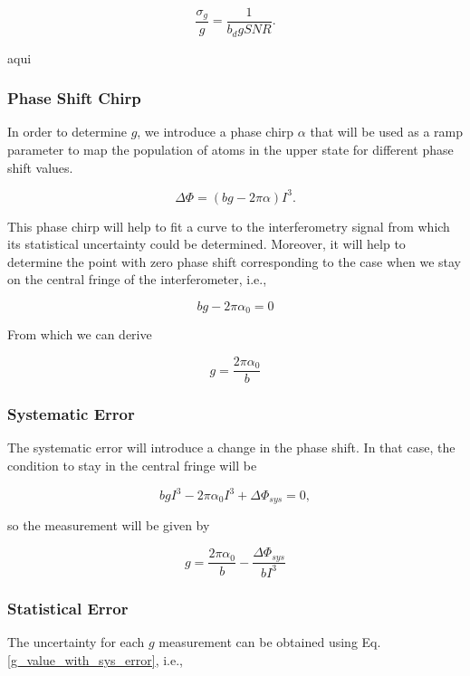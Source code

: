 \documentclass{article}
\begin{document}
\begin{equation}\label{sensitivity_eq_dipole}
    \frac{\sigma_{g}}{g} = \frac{1}{b_{d} g SNR}.
\end{equation}

aqui 

\subsubsection{Phase Shift Chirp}
In order to determine $g$, we introduce a phase chirp $\alpha$ that will be used as a ramp parameter to map the population of atoms in the upper state for different phase shift values. 

\begin{equation}
    \Delta \Phi = (b g  - 2\pi \alpha) I^3.
\end{equation}

This phase chirp will help to fit a curve to the interferometry signal from which its statistical uncertainty could be determined. Moreover, it will help to determine the point with zero phase shift corresponding to the case when we stay on the central fringe of the interferometer, i.e.,

\begin{equation}
    b g  - 2\pi \alpha_{0} = 0
\end{equation}

From which we can derive

\begin{equation}
    g = \frac{2\pi \alpha_{0}}{b}
\end{equation}

\subsubsection{Systematic Error}
The systematic error will introduce a change in the phase shift. In that case, the condition to stay in the central fringe will be

\begin{equation}
    b g I^3 - 2\pi \alpha_{0} I^3 + \Delta \Phi_{sys}= 0,
\end{equation}

so the measurement will be given by

\begin{equation}\label{g_value_with_sys_error}
    g = \frac{2\pi \alpha_{0}}{b} - \frac{\Delta \Phi_{sys}}{b I^3}
\end{equation}

\subsubsection{Statistical Error}
The uncertainty for each $g$ measurement can be obtained using Eq. \ref{g_value_with_sys_error}, i.e.,
\end{document}
